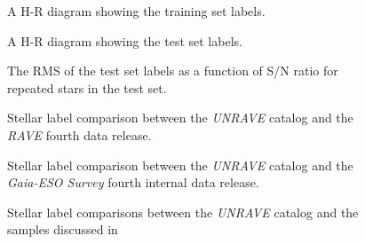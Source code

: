 \documentclass[preprint2,trackchanges]{aastex}
\newcommand{\project}[1]{\textsl{#1}}
\begin{document}
\clearpage

\begin{figure}[p]
\caption{A H-R diagram showing the training set labels.\label{fig:training-set-hrd}}
\end{figure}

\begin{figure}[p]
\caption{A H-R diagram showing the test set labels.\label{fig:test-set-hrd}}
\end{figure}

\begin{figure}[p]
\caption{The RMS of the test set labels as a function of S/N ratio for repeated stars in the test set.\label{fig:test-set-repeats}}
\end{figure}

\begin{figure}[p]
\caption{Stellar label comparison between the \project{UNRAVE} catalog and the \project{RAVE} fourth data release.\label{fig:dr4-comparison}}
\end{figure}

\begin{figure}[p]
\caption{Stellar label comparison between the \project{UNRAVE} catalog and the \project{Gaia-ESO Survey} fourth internal data release.\label{fig:dr4-comparison}}
\end{figure}

\begin{figure}[p]
\caption{Stellar label comparisons between the \project{UNRAVE} catalog and the samples discussed in \citep{Kordopatis_2013}}
\end{figure}
\end{document}
